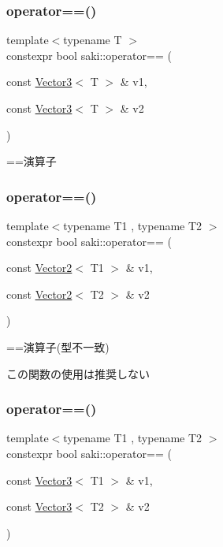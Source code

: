 \subsubsection{\texorpdfstring{operator==()}{operator==()}\hspace{0.1cm}{\footnotesize\ttfamily [2/4]}}
{\footnotesize\ttfamily template$<$typename T $>$ \\
constexpr bool saki\+::operator== (\begin{DoxyParamCaption}\item[{const \mbox{\hyperlink{classsaki_1_1_vector3}{Vector3}}$<$ T $>$ \&}]{v1,  }\item[{const \mbox{\hyperlink{classsaki_1_1_vector3}{Vector3}}$<$ T $>$ \&}]{v2 }\end{DoxyParamCaption})}



==演算子 

\mbox{\label{namespacesaki_a033d4b861140a6c00a8cb56ad71d463a}} 
\subsubsection{\texorpdfstring{operator==()}{operator==()}\hspace{0.1cm}{\footnotesize\ttfamily [3/4]}}
{\footnotesize\ttfamily template$<$typename T1 , typename T2 $>$ \\
constexpr bool saki\+::operator== (\begin{DoxyParamCaption}\item[{const \mbox{\hyperlink{classsaki_1_1_vector2}{Vector2}}$<$ T1 $>$ \&}]{v1,  }\item[{const \mbox{\hyperlink{classsaki_1_1_vector2}{Vector2}}$<$ T2 $>$ \&}]{v2 }\end{DoxyParamCaption})}



==演算子(型不一致) 

この関数の使用は推奨しない \mbox{\label{namespacesaki_a487f0b513be6d4a0aecafeec28b6fc69}} 
\subsubsection{\texorpdfstring{operator==()}{operator==()}\hspace{0.1cm}{\footnotesize\ttfamily [4/4]}}
{\footnotesize\ttfamily template$<$typename T1 , typename T2 $>$ \\
constexpr bool saki\+::operator== (\begin{DoxyParamCaption}\item[{const \mbox{\hyperlink{classsaki_1_1_vector3}{Vector3}}$<$ T1 $>$ \&}]{v1,  }\item[{const \mbox{\hyperlink{classsaki_1_1_vector3}{Vector3}}$<$ T2 $>$ \&}]{v2 }\end{DoxyParamCaption})}



